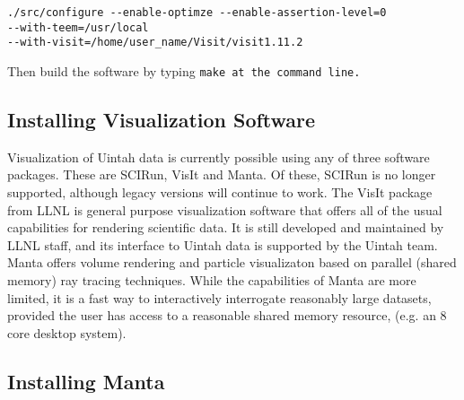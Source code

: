 \begin{Verbatim}[fontsize=\footnotesize]
./src/configure --enable-optimze --enable-assertion-level=0 
--with-teem=/usr/local
--with-visit=/home/user_name/Visit/visit1.11.2
\end{Verbatim}

Then build the software by typing \tt make \normalfont at the command line.

\subsection{Installing Visualization Software}

Visualization of Uintah data is currently possible using any of three
software packages.  These are SCIRun, VisIt and Manta.  Of these, SCIRun is
no longer supported, although legacy versions will continue to work.  The
VisIt package from LLNL is general purpose visualization software that offers
all of the usual capabilities for rendering scientific data.  It is still
developed and maintained by LLNL staff, and its interface to Uintah data is
supported by the Uintah team.  Manta offers volume rendering and particle
visualizaton based on parallel (shared memory) ray tracing techniques.
While the capabilities of Manta are more limited, it is a fast way to
interactively interrogate reasonably large datasets, provided the user has
access to a reasonable shared memory resource, (e.g. an 8 core desktop system).




\subsection{Installing Manta}



